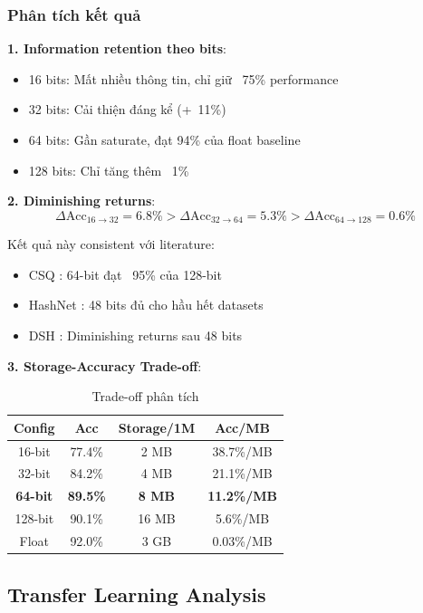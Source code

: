 \documentclass[12pt,a4paper]{article}
\begin{document}
\subsubsection{Phân tích kết quả}

\textbf{1. Information retention theo bits}:
\begin{itemize}
    \item 16 bits: Mất nhiều thông tin, chỉ giữ ~75\% performance
    \item 32 bits: Cải thiện đáng kể (+~11\%)
    \item 64 bits: Gần saturate, đạt 94\% của float baseline
    \item 128 bits: Chỉ tăng thêm ~1\%
\end{itemize}

\textbf{2. Diminishing returns}:
\begin{equation}
    \Delta\text{Acc}_{16\rightarrow32} = 6.8\% > \Delta\text{Acc}_{32\rightarrow64} = 5.3\% > \Delta\text{Acc}_{64\rightarrow128} = 0.6\%
\end{equation}

Kết quả này consistent với literature:
\begin{itemize}
    \item CSQ \cite{yuan2020csq}: 64-bit đạt ~95\% của 128-bit
    \item HashNet \cite{cao2017hashnet}: 48 bits đủ cho hầu hết datasets
    \item DSH \cite{liu2016deep}: Diminishing returns sau 48 bits
\end{itemize}

\textbf{3. Storage-Accuracy Trade-off}:

\begin{table}[H]
\centering
\caption{Trade-off phân tích}
\begin{tabular}{c|cc|c}
\toprule
\textbf{Config} & \textbf{Acc} & \textbf{Storage/1M} & \textbf{Acc/MB} \\
\midrule
16-bit & 77.4\% & 2 MB & 38.7\%/MB \\
32-bit & 84.2\% & 4 MB & 21.1\%/MB \\
\textbf{64-bit} & \textbf{89.5\%} & \textbf{8 MB} & \textbf{11.2\%/MB} \\
128-bit & 90.1\% & 16 MB & 5.6\%/MB \\
Float & 92.0\% & 3 GB & 0.03\%/MB \\
\bottomrule
\end{tabular}
\end{table}

\subsection{Transfer Learning Analysis}
\end{document}
